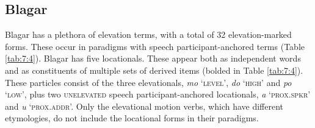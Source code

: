 \subsection{Blagar}
Blagar has a plethora of elevation terms, with a total of 32 elevation-marked forms. These occur in paradigms with speech participant-anchored terms (Table \ref{tab:7:4}). Blagar has five locationals. These appear both as independent words and as constituents of multiple sets of derived items (bolded in Table \ref{tab:7:4}). These particles consist of the three elevationals, \textit{mo} `\textsc{level',} \textit{do} `\textsc{high'} and \textit{po} `\textsc{low',} plus two \textsc{unelevated} speech participant-anchored locationals, \textit{{\textglotstop}}\textit{a} `\textsc{prox.spkr'} and \textit{{\textglotstop}}\textit{u} `\textsc{prox.addr'.} Only the elevational motion verbs, which have different etymologies, do not include the locational forms in their paradigms. 



